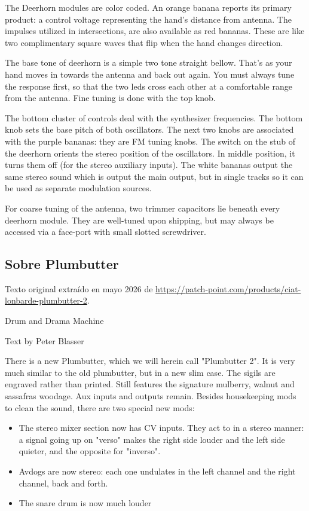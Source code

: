 The Deerhorn modules are color coded. An orange banana reports its primary product: a control voltage representing the hand's distance from antenna. The impulses utilized in intersections, are also available as red bananas. These are like two complimentary square waves that flip when the hand changes direction.

The base tone of deerhorn is a simple two tone straight bellow. That's as your hand moves in towards the antenna and back out again. You must always tune the response first, so that the two leds cross each other at a comfortable range from the antenna. Fine tuning is done with the top knob.

The bottom cluster of controls deal with the synthesizer frequencies. The bottom knob sets the base pitch of both oscillators. The next two knobs are associated with the purple bananas: they are FM tuning knobs. The switch on the stub of the deerhorn orients the stereo position of the oscillators. In middle position, it turns them off (for the stereo auxiliary inputs). The white bananas output the same stereo sound which is output the main output, but in single tracks so it can be used as separate modulation sources.

For coarse tuning of the antenna, two trimmer capacitors lie beneath every deerhorn module. They are well-tuned upon shipping, but may always be accessed via a face-port with small slotted screwdriver.

\newpage

\subsection{Sobre Plumbutter}

Texto original extraído en mayo 2026 de \url{https://patch-point.com/products/ciat-lonbarde-plumbutter-2}.

Drum and Drama Machine

Text by Peter Blasser

There is a new Plumbutter, which we will herein call "Plumbutter 2". It is very much similar to the old plumbutter, but in a new slim case. The sigils are engraved rather than printed. Still features the signature mulberry, walnut and sassafras woodage. Aux inputs and outputs remain. Besides housekeeping mods to clean the sound, there are two special new mods:

\begin{itemize}
	\item The stereo mixer section now has CV inputs. They act to in a stereo manner: a signal going up on "verso" makes the right side louder and the left side quieter, and the opposite for "inverso".
	\item Avdogs are now stereo: each one undulates in the left channel and the right channel, back and forth.
	\item The snare drum is now much louder
\end{itemize}


